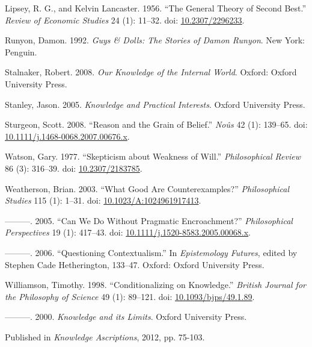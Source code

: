 \documentclass[
  10pt,
  letterpaper,
  DIV=11,
  numbers=noendperiod,
  twoside]{scrartcl}
\newlength{\cslhangindent}
\newenvironment{CSLReferences}[2] %
 {\begin{list}{}{%
  \setlength{\itemindent}{0pt}
  \setlength{\leftmargin}{0pt}
  \setlength{\parsep}{0pt}
  \ifodd #1
   \setlength{\leftmargin}{\cslhangindent}
   \setlength{\itemindent}{-1\cslhangindent}
  \fi
  \setlength{\itemsep}{#2\baselineskip}}}
 {\end{list}}
\begin{document}
\begin{CSLReferences}{1}{0}
Lipsey, R. G., and Kelvin Lancaster. 1956. {``The General Theory of
Second Best.''} \emph{Review of Economic Studies} 24 (1): 11--32. doi:
\href{https://doi.org/10.2307/2296233}{10.2307/2296233}.

Runyon, Damon. 1992. \emph{Guys \& Dolls: The Stories of {D}amon
{R}unyon}. New York: Penguin.

Stalnaker, Robert. 2008. \emph{Our Knowledge of the Internal World}.
Oxford: Oxford University Press.

Stanley, Jason. 2005. \emph{{Knowledge and Practical Interests}}. Oxford
University Press.

Sturgeon, Scott. 2008. {``Reason and the Grain of Belief.''}
\emph{No{û}s} 42 (1): 139--65. doi:
\href{https://doi.org/10.1111/j.1468-0068.2007.00676.x}{10.1111/j.1468-0068.2007.00676.x}.

Watson, Gary. 1977. {``Skepticism about Weakness of Will.''}
\emph{Philosophical Review} 86 (3): 316--39. doi:
\href{https://doi.org/10.2307/2183785}{10.2307/2183785}.

Weatherson, Brian. 2003. {``{What Good Are Counterexamples?}''}
\emph{Philosophical Studies} 115 (1): 1--31. doi:
\href{https://doi.org/10.1023/A:1024961917413}{10.1023/A:1024961917413}.

---------. 2005. {``{Can We Do Without Pragmatic Encroachment?}''}
\emph{Philosophical Perspectives} 19 (1): 417--43. doi:
\href{https://doi.org/10.1111/j.1520-8583.2005.00068.x}{10.1111/j.1520-8583.2005.00068.x}.

---------. 2006. {``Questioning Contextualism.''} In \emph{Epistemology
Futures}, edited by Stephen Cade Hetherington, 133--47. Oxford: Oxford
University Press.

Williamson, Timothy. 1998. {``{Conditionalizing on Knowledge}.''}
\emph{British Journal for the Philosophy of Science} 49 (1): 89--121.
doi: \href{https://doi.org/10.1093/bjps/49.1.89}{10.1093/bjps/49.1.89}.

---------. 2000. \emph{{Knowledge and its Limits}}. Oxford University
Press.

\end{CSLReferences}



\noindent Published in\emph{
Knowledge Ascriptions}, 2012, pp. 75-103.
\end{document}
